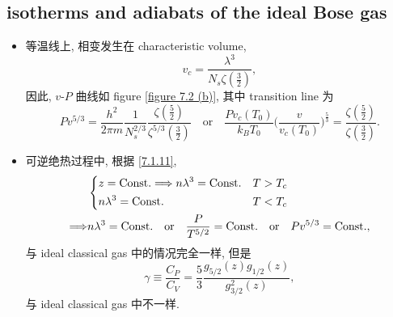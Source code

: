 \subsection{isotherms and adiabats of the ideal Bose gas}
\begin{itemize}
	\item 等温线上, 相变发生在 characteristic volume,
	\begin{equation}
		v_c = \frac{\lambda^3}{N_s \zeta(\frac{3}{2})},
	\end{equation}
	因此, $v$-$P$ 曲线如 figure \ref{figure 7.2 (b)}, 其中 transition line 为
	\begin{equation}
		P v^{5 / 3} = \frac{h^2}{2 \pi m} \frac{1}{N_s^{2 / 3}} \frac{\zeta(\frac{5}{2})}{\zeta^{5 / 3}(\frac{3}{2})} \quad \text{or} \quad \frac{P v_c(T_0)}{k_B T_0} \Big( \frac{v}{v_c(T_0)} \Big)^{\frac{5}{3}} = \frac{\zeta(\frac{5}{2})}{\zeta(\frac{3}{2})}.
	\end{equation}
	
	\item 可逆绝热过程中, 根据 \eqref{7.1.11},
	\begin{align}
		& \begin{dcases}
			z = \text{Const.} \Longrightarrow n \lambda^3 = \text{Const.} & T > T_c \\
			n \lambda^3 = \text{Const.} & T < T_c
		\end{dcases} \notag \\
		\Longrightarrow & n \lambda^3 = \text{Const.} \quad \text{or} \quad \frac{P}{T^{5 / 2}} = \text{Const.} \quad \text{or} \quad P v^{5 / 3} = \text{Const.},
	\end{align}
	与 ideal classical gas 中的情况完全一样, 但是
	\begin{equation}
		\gamma \equiv \frac{C_P}{C_V} = \frac{5}{3} \frac{g_{5 / 2}(z) g_{1 / 2}(z)}{g_{3 / 2}^2(z)},
	\end{equation}
	与 ideal classical gas 中不一样.
\end{itemize}
